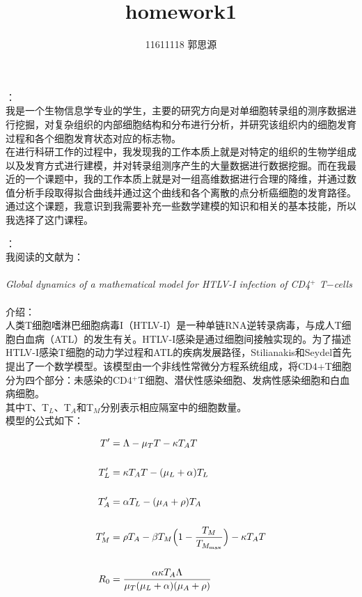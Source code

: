 \documentclass[12pt,a4paper]{article}
\begin{document}
 

\title{homework1}
	\author{11611118 郭思源}  

	 ：\\

	\large {我是一个生物信息学专业的学生，主要的研究方向是对单细胞转录组的测序数据进行挖掘，对复杂组织的内部细胞结构和分布进行分析，并研究该组织内的细胞发育过程和各个细胞发育状态对应的标志物。\\


	在进行科研工作的过程中，我发现我的工作本质上就是对特定的组织的生物学组成以及发育方式进行建模，并对转录组测序产生的大量数据进行数据挖掘。而在我最近的一个课题中，我的工作本质上就是对一组高维数据进行合理的降维，并通过数值分析手段取得拟合曲线并通过这个曲线和各个离散的点分析癌细胞的发育路径。通过这个课题，我意识到我需要补充一些数学建模的知识和相关的基本技能，所以我选择了这门课程。\\}
	
	\newpage
	 ： \\

	\noindent \large {我阅读的文献为：\\\\
	\textit
	{Global dynamics of a mathematical model for HTLV-I infection of CD4$^+$ T$-$cells}  \\\\
	介绍：\\
	

	人类T细胞嗜淋巴细胞病毒I（HTLV-I）是一种单链RNA逆转录病毒，与成人T细胞白血病（ATL）的发生有关。HTLV-I感染是通过细胞间接触实现的。为了描述HTLV-I感染T细胞的动力学过程和ATL的疾病发展路径，Stilianakis和Seydel首先提出了一个数学模型。该模型由一个非线性常微分方程系统组成，将CD4+T细胞分为四个部分：未感染的CD4$^+$T细胞、潜伏性感染细胞、发病性感染细胞和白血病细胞。\\
	其中T、T$_L$、T$_A$和T$_M$分别表示相应隔室中的细胞数量。\\
	模型的公式如下：\\}
		
	\begin{equation}
	\begin{aligned}
	T' &= \Lambda - \mu_{T}T - \kappa T_{A}T\\\\
	T'_{L} &= \kappa T_{A}T - (\mu_{L} + \alpha)T_{L}\\\\
	T'_{A} &= \alpha T_{L} - (\mu_{A} + \rho)T_{A}\\\\
	T'_{M} &= \rho T_{A} - \beta T_{M} \Bigl( 1 - \frac{T_{M}}{T_{M_{\max}}} \Bigr) - \kappa T_{A}T\\\\
	R_{0} &= \frac{\alpha \kappa T_{A} \Lambda}{\mu_{T} (\mu_{L} + \alpha) (\mu_{A} + \rho) }\\\\
	\end{aligned}
	\end{equation}
\end{document}
